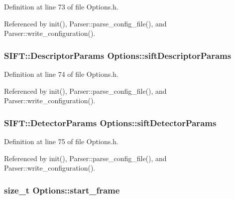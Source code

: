 \-Definition at line 73 of file \-Options.\-h.



\-Referenced by init(), \-Parser\-::parse\-\_\-config\-\_\-file(), and \-Parser\-::write\-\_\-configuration().

\hypertarget{class_options_a59c9196b898a79ecdda3599f932aba43}{
\subsubsection[{sift\-Descriptor\-Params}]{\setlength{\rightskip}{0pt plus 5cm}\-S\-I\-F\-T\-::\-Descriptor\-Params {\bf \-Options\-::sift\-Descriptor\-Params}}}
\label{class_options_a59c9196b898a79ecdda3599f932aba43}


\-Definition at line 74 of file \-Options.\-h.



\-Referenced by init(), \-Parser\-::parse\-\_\-config\-\_\-file(), and \-Parser\-::write\-\_\-configuration().

\hypertarget{class_options_ae1ba0a4c219005ee896951f047852f12}{
\subsubsection[{sift\-Detector\-Params}]{\setlength{\rightskip}{0pt plus 5cm}\-S\-I\-F\-T\-::\-Detector\-Params {\bf \-Options\-::sift\-Detector\-Params}}}
\label{class_options_ae1ba0a4c219005ee896951f047852f12}


\-Definition at line 75 of file \-Options.\-h.



\-Referenced by init(), \-Parser\-::parse\-\_\-config\-\_\-file(), and \-Parser\-::write\-\_\-configuration().

\hypertarget{class_options_ab9c7cf4df6590dfc009342a9ac562c8e}{
\subsubsection[{start\-\_\-frame}]{\setlength{\rightskip}{0pt plus 5cm}size\-\_\-t {\bf \-Options\-::start\-\_\-frame}}}
\label{class_options_ab9c7cf4df6590dfc009342a9ac562c8e}


